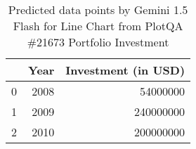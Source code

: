 \begin{table}
    \begin{tabular}{lrr}
\toprule
 & Year & Investment (in USD) \\
\midrule
0 & 2008 & 54000000 \\
1 & 2009 & 240000000 \\
2 & 2010 & 200000000 \\
\bottomrule
\end{tabular}
     \caption{Predicted data points by Gemini 1.5 Flash for Line Chart from PlotQA \#21673 Portfolio Investment}
     \label{tab:gemini-plotqa-line-21673}
     \end{table}
